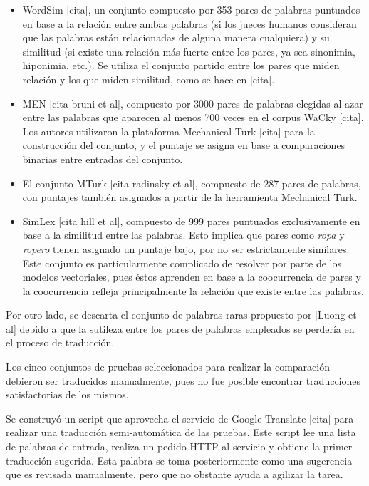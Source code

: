 \begin{itemize}

\item WordSim [cita], un conjunto compuesto por 353 pares de palabras puntuados en base a la
relación entre ambas palabras (si los jueces humanos consideran que las palabras están relacionadas
de alguna manera cualquiera) y su similitud (si existe una relación más fuerte entre los pares, ya
sea sinonimia, hiponimia, etc.). Se utiliza el conjunto partido entre los pares que miden relación y
los que miden similitud, como se hace en [cita].

\item MEN [cita bruni et al], compuesto por 3000 pares de palabras elegidas al azar entre las
palabras que aparecen al menos 700 veces en el corpus WaCky [cita]. Los autores utilizaron la
plataforma Mechanical Turk [cita] para la construcción del conjunto, y el puntaje se asigna en base
a comparaciones binarias entre entradas del conjunto.

\item El conjunto MTurk [cita radinsky et al], compuesto de 287 pares de palabras, con puntajes
también asignados a partir de la herramienta Mechanical Turk.

\item SimLex [cita hill et al], compuesto de 999 pares puntuados exclusivamente en base a la
similitud entre las palabras. Esto implica que pares como \textit{ropa} y \textit{ropero} tienen
asignado un puntaje bajo, por no ser estrictamente similares. Este conjunto es particularmente
complicado de resolver por parte de los modelos vectoriales, pues éstos aprenden en base a la
coocurrencia de pares y la coocurrencia refleja principalmente la relación que existe entre las
palabras.

\end{itemize}

Por otro lado, se descarta el conjunto de palabras raras propuesto por [Luong et al] debido a que la
sutileza entre los pares de palabras empleados se perdería en el proceso de traducción.


Los cinco conjuntos de pruebas seleccionados para realizar la comparación debieron ser traducidos
manualmente, pues no fue posible encontrar traducciones satisfactorias de los mismos.

Se construyó un script que aprovecha el servicio de Google Translate [cita] para realizar una
traducción semi-automática de las pruebas. Este script lee una lista de palabras de entrada, realiza
un pedido HTTP al servicio y obtiene la primer traducción sugerida. Esta palabra se toma
posteriormente como una sugerencia que es revisada manualmente, pero que no obstante ayuda a
agilizar la tarea.

